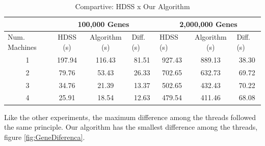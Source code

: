 \documentclass[journal]{IEEEtran}
\begin{document}
\begin{table}[htb]
\centering
\tiny
\caption{Compartive: HDSS x Our Algorithm}

\begin{tabular}{c|c|c|c|c|c|c|}
\cline{2-7}
\multicolumn{1}{l|}{}                 & \multicolumn{3}{c|}{100,000 Genes}                              & \multicolumn{3}{c|}{2,000,000 Genes}                                                  \\ \hline
\multicolumn{1}{|l|}{Num. Machines} & HDSS (s) & Algorithm (s) & \multicolumn{1}{l|}{Diff. (s)} & \multicolumn{1}{l|}{HDSS (s)} & Algorithm (s) & \multicolumn{1}{l|}{Diff. (s)} \\ \hline
\multicolumn{1}{|c|}{1 }       &197.94     & 116.43              & 81.51                          & 927.43                         & 889.13              &           38.30                  \\ \hline
\multicolumn{1}{|c|}{2 }      & 79.76     & 53.43              & 26.33                            & 702.65                          & 632.73              & 69.72                           \\ \hline
\multicolumn{1}{|c|}{3 }      & 34.76     & 21.39              & 13.37                            & 502.65                          & 432.43             &               70.22                  \\ \hline
\multicolumn{1}{|c|}{4 }      & 25.91     & 18.54              & 12.63                            & 479.54                          & 411.46             &               68.08  \\ \hline
\end{tabular}
\label{table: gene}
\end{table}

Like the other experiments, the maximum difference among the threads followed the same principle. Our algorithm has the smallest difference among the threads, figure \ref{fig:GeneDiferenca}.
\end{document}
